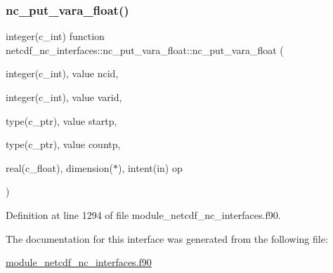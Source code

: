 \subsubsection{\texorpdfstring{nc\+\_\+put\+\_\+vara\+\_\+float()}{nc\_put\_vara\_float()}}
{\footnotesize\ttfamily integer(c\+\_\+int) function netcdf\+\_\+nc\+\_\+interfaces\+::nc\+\_\+put\+\_\+vara\+\_\+float\+::nc\+\_\+put\+\_\+vara\+\_\+float (\begin{DoxyParamCaption}\item[{integer(c\+\_\+int), value}]{ncid,  }\item[{integer(c\+\_\+int), value}]{varid,  }\item[{type(c\+\_\+ptr), value}]{startp,  }\item[{type(c\+\_\+ptr), value}]{countp,  }\item[{real(c\+\_\+float), dimension($\ast$), intent(in)}]{op }\end{DoxyParamCaption})}



Definition at line 1294 of file module\+\_\+netcdf\+\_\+nc\+\_\+interfaces.\+f90.



The documentation for this interface was generated from the following file\+:\begin{DoxyCompactItemize}
\item 
\hyperlink{module__netcdf__nc__interfaces_8f90}{module\+\_\+netcdf\+\_\+nc\+\_\+interfaces.\+f90}\end{DoxyCompactItemize}
